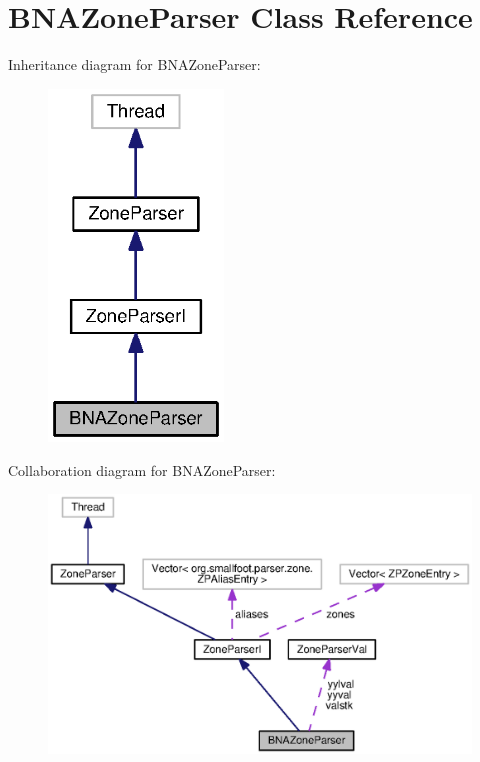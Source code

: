\section{B\-N\-A\-Zone\-Parser Class Reference}
\label{classorg_1_1smallfoot_1_1parser_1_1zone_1_1BNAZoneParser}


Inheritance diagram for B\-N\-A\-Zone\-Parser\-:\nopagebreak
\begin{figure}[H]
\begin{center}
\leavevmode
\includegraphics[width=132pt]{classorg_1_1smallfoot_1_1parser_1_1zone_1_1BNAZoneParser__inherit__graph}
\end{center}
\end{figure}


Collaboration diagram for B\-N\-A\-Zone\-Parser\-:\nopagebreak
\begin{figure}[H]
\begin{center}
\leavevmode
\includegraphics[width=350pt]{classorg_1_1smallfoot_1_1parser_1_1zone_1_1BNAZoneParser__coll__graph}
\end{center}
\end{figure}
